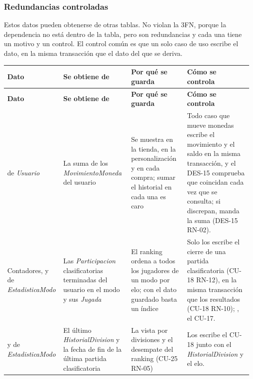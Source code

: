 \subsubsection*{Redundancias controladas}

Estos datos pueden obtenerse de otras tablas. No violan la 3FN, porque la dependencia no está dentro de la tabla, pero son redundancias y cada una tiene un motivo y un control. El control común es que un solo caso de uso escribe el dato, en la misma transacción que el dato del que se deriva.

\begin{center}\small
\begin{longtable}{|L{0.19\textwidth}|L{0.20\textwidth}|L{0.24\textwidth}|L{0.25\textwidth}|}
\hline
\textbf{Dato} & \textbf{Se obtiene de} & \textbf{Por qué se guarda} & \textbf{Cómo se controla} \\ \hline
\endfirsthead
\hline
\textbf{Dato} & \textbf{Se obtiene de} & \textbf{Por qué se guarda} & \textbf{Cómo se controla} \\ \hline
\endhead
{} de \textit{Usuario} & La suma de los \textit{MovimientoMoneda} del usuario & Se muestra en la tienda, en la personalización y en cada compra; sumar el historial en cada una es caro & Todo caso que mueve monedas escribe el movimiento y el saldo en la misma transacción, y el \mbox{DES-15} comprueba que coincidan cada vez que se consulta; si discrepan, manda la suma (\mbox{DES-15} \mbox{RN-02}). \\ \hline
Contadores,  y  de \textit{EstadisticaModo} & Las \textit{Participacion} clasificatorias terminadas del usuario en el modo y sus \textit{Jugada} & El ranking ordena a todos los jugadores de un modo por elo; con el dato guardado basta un índice & Solo los escribe el cierre de una partida clasificatoria (\mbox{CU-18} \mbox{RN-12}), en la misma transacción que los resultados (\mbox{CU-18} \mbox{RN-10}); , el \mbox{CU-17}. \\ \hline
{} y  de \textit{EstadisticaModo} & El último \textit{HistorialDivision} y la fecha de fin de la última partida clasificatoria & La vista por divisiones y el desempate del ranking (\mbox{CU-25} \mbox{RN-05}) & Los escribe el \mbox{CU-18} junto con el \textit{HistorialDivision} y el elo. \\ \hline

\end{longtable}
\end{center}
